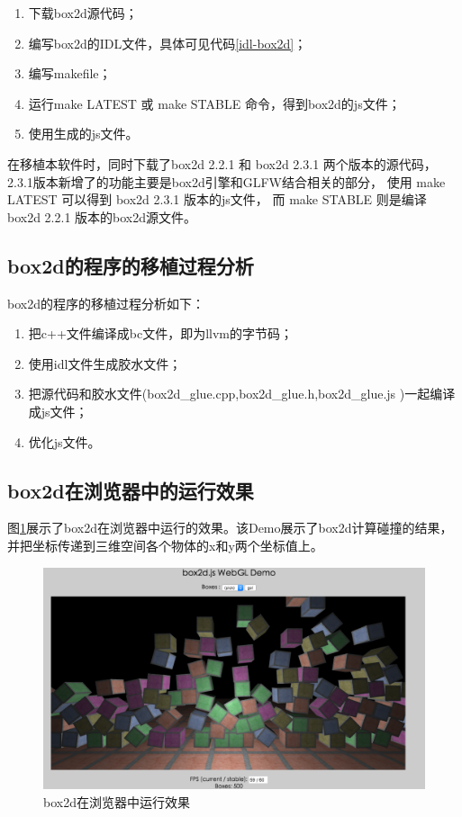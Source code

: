 \begin{enumerate}[itemindent=2em]
    \item 下载box2d源代码；
    \item 编写box2d的IDL文件，具体可见代码\ref{idl-box2d}；
    \item 编写makefile；   	
	\item 运行make LATEST 或 make STABLE 命令，得到box2d的js文件；
	\item 使用生成的js文件。
\end{enumerate}

在移植本软件时，同时下载了box2d 2.2.1 和 box2d 2.3.1 两个版本的源代码，
2.3.1版本新增了的功能主要是box2d引擎和GLFW结合相关的部分，
使用 make LATEST 可以得到 box2d 2.3.1 版本的js文件，
而 make STABLE 则是编译 box2d 2.2.1 版本的box2d源文件。

\subsection{box2d的程序的移植过程分析}

box2d的程序的移植过程分析如下：

\begin{enumerate}[itemindent=2em]
    \item 把c++文件编译成bc文件，即为llvm的字节码；
    \item 使用idl文件生成胶水文件；
    \item 把源代码和胶水文件(box2d\_glue.cpp,box2d\_glue.h,box2d\_glue.js )一起编译成js文件；
	\item 优化js文件。
\end{enumerate}

\subsection{box2d在浏览器中的运行效果}

图\ref{box2d-html}展示了box2d在浏览器中运行的效果。该Demo展示了box2d计算碰撞的结果，并把坐标传递到三维空间各个物体的x和y两个坐标值上。

\newpage

\begin{figure}[h!] %
    \centering
    \includegraphics[width=450bp]{figure/pic/box2d-sample-html.png}
    \caption{box2d在浏览器中运行效果}
    \label{box2d-html}
\end{figure}

